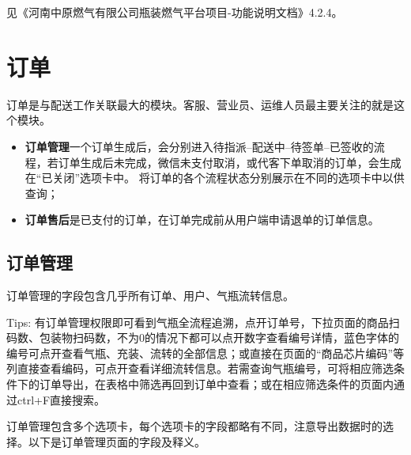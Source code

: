 \documentclass[UTF8]{ctexart}
\begin{document}
见《河南中原燃气有限公司瓶装燃气平台项目-功能说明文档》4.2.4。

\section{订单}

订单是与配送工作关联最大的模块。客服、营业员、运维人员最主要关注的就是这个模块。
\begin{itemize}
	\item \textbf{订单管理}一个订单生成后，会分别进入待指派--配送中--待签单--已签收的流程，若订单生成后未完成，微信未支付取消，或代客下单取消的订单，会生成在“已关闭”选项卡中。
将订单的各个流程状态分别展示在不同的选项卡中以供查询；
    \item \textbf{订单售后}是已支付的订单，在订单完成前从用户端申请退单的订单信息。
\end{itemize}
\subsection{订单管理}

订单管理的字段包含几乎所有订单、用户、气瓶流转信息。

Tips: 有订单管理权限即可看到气瓶全流程追溯，点开订单号，下拉页面的商品扫码数、包装物扫码数，不为0的情况下都可以点开数字查看编号详情，蓝色字体的编号可点开查看气瓶、充装、流转的全部信息；或直接在页面的“商品芯片编码”等列直接查看编码，可点开查看详细流转信息。若需查询气瓶编号，可将相应筛选条件下的订单导出，在表格中筛选再回到订单中查看；或在相应筛选条件的页面内通过ctrl+F直接搜索。

订单管理包含多个选项卡，每个选项卡的字段都略有不同，注意导出数据时的选择。以下是订单管理页面的字段及释义。
\end{document}
